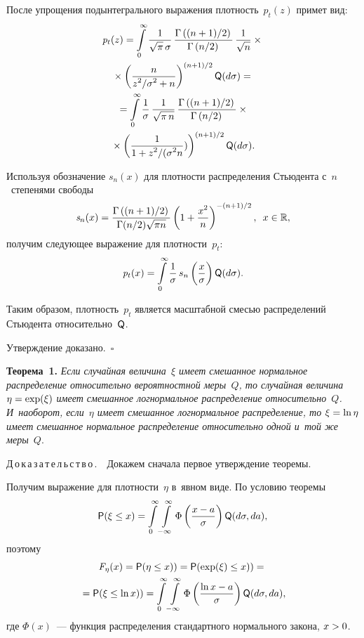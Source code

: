 \begin{multicols}{2}
После упрощения подынтегрального выражения плотность~$\mathit{p}_t(z)$ примет вид:
\begin{multline*}
\mathit{p}_t(z) = \int\limits_0^\infty \displaystyle\frac{\displaystyle 1\mathstrut}{\displaystyle \sqrt{\pi} \, \sigma\mathstrut} \,
\displaystyle\frac{\displaystyle \Gamma\left(({n+1})/{2}\right)\mathstrut}{\displaystyle \Gamma\left({n}/{2}\right)\mathstrut} \, 
 \displaystyle\frac{\displaystyle 1\mathstrut}{\displaystyle \sqrt{n}\mathstrut}\times{}\\
 {}\times \left(\displaystyle\frac{\displaystyle n\mathstrut}{\displaystyle {z^2}/{\sigma^2}+n\mathstrut}\right)^{({n+1})/{2}}  {\sf Q} (d\sigma) ={}  \\
{}= \int\limits_0^\infty \displaystyle\frac{\displaystyle 1\mathstrut}{\displaystyle \sigma\mathstrut} \, \displaystyle\frac{\displaystyle 1\mathstrut}{\displaystyle \sqrt{\pi \, n}\mathstrut} \,
\displaystyle\frac{\displaystyle \Gamma\left(({n+1})/{2}\right)\mathstrut}{\displaystyle \Gamma\left({n}/{2}\right)\mathstrut}\times{}\\
{}\times
 \left(\displaystyle\frac{\displaystyle 1\mathstrut}{\displaystyle 1+{z^2}/({\sigma^2 n}\mathstrut})\right)^{({n+1})/{2}}  {\sf Q} (d\sigma).
\end{multline*}

Используя обозначение $\mathit{s}_n(x)$ для плотности распределения Стьюдента с~$n$~степенями свободы
$$
\mathit{s}_n(x) = \displaystyle\frac{\displaystyle \Gamma\left(({n+1})/{2}\right)\mathstrut}{\displaystyle \Gamma({n}/{2})\sqrt{\pi n}\mathstrut}\left(1 + \displaystyle\frac{\displaystyle x^2\mathstrut}{\displaystyle n\mathstrut}\right)^{-({n+1})/{2}}, \enskip x \in \mathbb{R},
$$
получим следующее выражение для плотности~$\mathit{p}_t$:
$$
\mathit{p}_t(x) = \int\limits_{0}^{\infty} \displaystyle\frac{\displaystyle 1\mathstrut}{\displaystyle \sigma\mathstrut} \, s_n\left(\displaystyle\frac{\displaystyle x\mathstrut}{\displaystyle \sigma\mathstrut}\right) {\sf Q} (d\sigma).
$$


Таким образом, плотность~$\mathit{p}_t$ является масштабной смесью распределений Стьюдента 
относительно~${\sf Q}$.

Утверждение доказано.~\hfill$\square$


\smallskip

\noindent
\textbf{Теорема~1.}
\textit{Если случайная величина~$\xi$ имеет смешанное нормальное распределение 
относительно вероятностной меры~$Q$, то случайная величина 
$\eta\hm=\exp(\xi)$ имеет смешанное логнормальное распределение относительно~$Q$. 
И~наоборот, если~$\eta$ имеет смешанное логнормальное распределение, то $\xi\hm=\ln 
\eta$ имеет смешанное нормальное распределение относительно одной и~той же меры~$Q$}.


\smallskip

\noindent
Д\,о\,к\,а\,з\,а\,т\,е\,л\,ь\,с\,т\,в\,о\,.\ \
Докажем сначала первое утверждение теоремы.

Получим выражение для плотности~$\eta$ в~явном виде. По условию теоремы
$$
{\sf P} (\xi \le x) = \int\limits_{0}^{\infty}  \int\limits_{-\infty}^{\infty} \Phi \left(\displaystyle\frac{\displaystyle  x-a\mathstrut}{\displaystyle \sigma\mathstrut} \right) {\sf Q}
 (d\sigma, da),
$$
поэтому
\begin{multline*}
\mathit{F}_\eta(x) = {\sf P} (\eta \le x)) = {\sf P} (\exp(\xi) \le x)) = {}\\
{}={\sf P} (\xi \le \ln x))
=\int\limits_{0}^{\infty}  \int\limits_{-\infty}^{\infty} \Phi \left(\displaystyle\frac{\displaystyle \ln x-a\mathstrut}{\displaystyle \sigma\mathstrut} \right) {\sf Q} (d\sigma, da),
\end{multline*}
где $\Phi(x)$~--- функция распределения стандартного нормального закона, $x\hm>0$.


\end{multicols}
